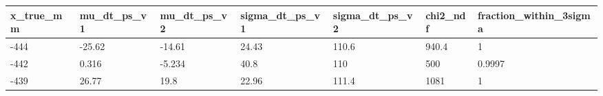 \begin{tabular}{lllllll}
\hline
x\_true\_mm & mu\_dt\_ps\_v1 & mu\_dt\_ps\_v2 & sigma\_dt\_ps\_v1 & sigma\_dt\_ps\_v2 & chi2\_ndf & fraction\_within\_3sigma \\
\hline
-444 & -25.62 & -14.61 & 24.43 & 110.6 & 940.4 & 1 \\
-442 & 0.316 & -5.234 & 40.8 & 110 & 500 & 0.9997 \\
-439 & 26.77 & 19.8 & 22.96 & 111.4 & 1081 & 1 \\
\hline
\end{tabular}
